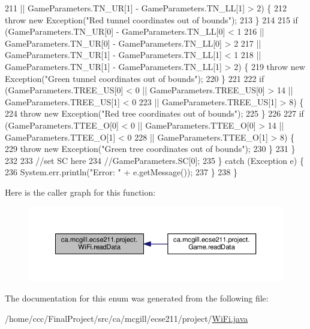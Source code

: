 \begin{DoxyCode}
211             || GameParameters.TN\_UR[1] - GameParameters.TN\_LL[1] > 2) \{
212           \textcolor{keywordflow}{throw} \textcolor{keyword}{new} Exception(\textcolor{stringliteral}{"Red tunnel coordinates out of bounds"});
213         \}
214 
215         \textcolor{keywordflow}{if} (GameParameters.TN\_UR[0] - GameParameters.TN\_LL[0] < 1
216             || GameParameters.TN\_UR[0] - GameParameters.TN\_LL[0] > 2
217             || GameParameters.TN\_UR[1] - GameParameters.TN\_LL[1] < 1
218             || GameParameters.TN\_UR[1] - GameParameters.TN\_LL[1] > 2) \{
219           \textcolor{keywordflow}{throw} \textcolor{keyword}{new} Exception(\textcolor{stringliteral}{"Green tunnel coordinates out of bounds"});
220         \}
221 
222         \textcolor{keywordflow}{if} (GameParameters.TREE\_US[0] < 0 || GameParameters.TREE\_US[0] > 14 || GameParameters.TREE\_US[1] < 
      0
223             || GameParameters.TREE\_US[1] > 8) \{
224           \textcolor{keywordflow}{throw} \textcolor{keyword}{new} Exception(\textcolor{stringliteral}{"Red tree coordinates out of bounds"});
225         \}
226 
227         \textcolor{keywordflow}{if} (GameParameters.TTEE\_O[0] < 0 || GameParameters.TTEE\_O[0] > 14 || GameParameters.TTEE\_O[1] < 0
228             || GameParameters.TTEE\_O[1] > 8) \{
229           \textcolor{keywordflow}{throw} \textcolor{keyword}{new} Exception(\textcolor{stringliteral}{"Green tree coordinates out of bounds"});
230         \}
231       \}
232       
233       \textcolor{comment}{//set SC here}
234       \textcolor{comment}{//GameParameters.SC[0];}
235     \} \textcolor{keywordflow}{catch} (Exception e) \{
236       System.err.println(\textcolor{stringliteral}{"Error: "} + e.getMessage());
237     \}
238   \}
\end{DoxyCode}
Here is the caller graph for this function\+:
\nopagebreak
\begin{figure}[H]
\begin{center}
\leavevmode
\includegraphics[width=350pt]{enumca_1_1mcgill_1_1ecse211_1_1project_1_1_wi_fi_a3488726983cda70dbde6f05c9c762f16_icgraph}
\end{center}
\end{figure}


The documentation for this enum was generated from the following file\+:\begin{DoxyCompactItemize}
\item 
/home/ccc/\+Final\+Project/src/ca/mcgill/ecse211/project/\hyperlink{_wi_fi_8java}{Wi\+Fi.\+java}\end{DoxyCompactItemize}
